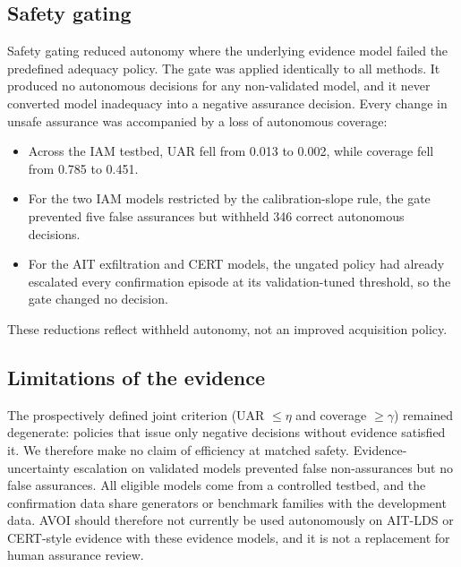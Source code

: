 \subsection{Safety gating}
Safety gating reduced autonomy where the underlying evidence model failed the predefined adequacy policy. The gate was
applied identically to all methods. It produced no autonomous decisions for any non-validated model, and it never
converted model inadequacy into a negative assurance decision. Every change in unsafe assurance was accompanied by a loss
of autonomous coverage:
\begin{itemize}
  \item Across the IAM testbed, UAR fell from 0.013 to 0.002, while coverage fell from 0.785 to 0.451.
  \item For the two IAM models restricted by the calibration-slope rule, the gate prevented five false assurances but
    withheld 346 correct autonomous decisions.
  \item For the AIT exfiltration and CERT models, the ungated policy had already escalated every confirmation episode
    at its validation-tuned threshold, so the gate changed no decision.
\end{itemize}
These reductions reflect withheld autonomy, not an improved acquisition policy.

\subsection{Limitations of the evidence}
The prospectively defined joint criterion (UAR $\le\eta$ and coverage $\ge\gamma$) remained degenerate: policies that
issue only negative decisions without evidence satisfied it. We therefore make no claim of efficiency at matched safety.
Evidence-uncertainty escalation on validated models prevented false non-assurances but no false assurances. All eligible
models come from a controlled testbed, and the confirmation data share generators or benchmark families with the
development data. AVOI should therefore not currently be used autonomously on AIT-LDS or CERT-style evidence with these
evidence models, and it is not a replacement for human assurance review.
